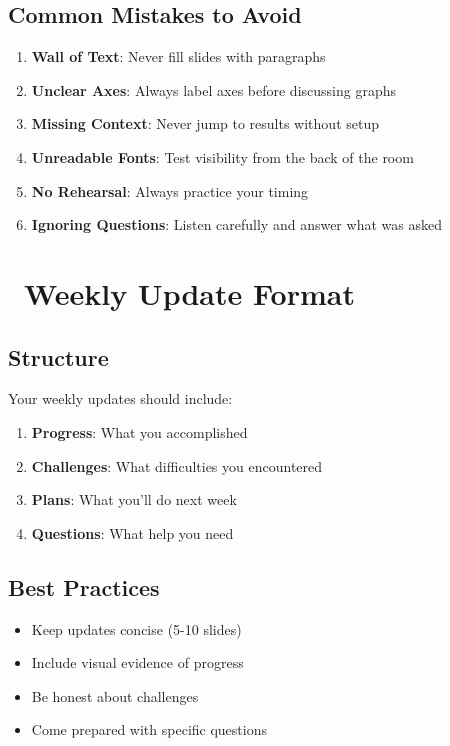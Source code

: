 \documentclass[11pt,a4paper]{article}
\begin{document}
\subsection{Common Mistakes to Avoid}

\begin{tcolorbox}[colback=red!10,colframe=red!50,title=Don't Do This!]
\begin{enumerate}
    \item \textbf{Wall of Text}: Never fill slides with paragraphs
    \item \textbf{Unclear Axes}: Always label axes before discussing graphs
    \item \textbf{Missing Context}: Never jump to results without setup
    \item \textbf{Unreadable Fonts}: Test visibility from the back of the room
    \item \textbf{No Rehearsal}: Always practice your timing
    \item \textbf{Ignoring Questions}: Listen carefully and answer what was asked
\end{enumerate}
\end{tcolorbox}


\section{\faCalendarCheck~Weekly Update Format}

\subsection{Structure}
Your weekly updates should include:
\begin{enumerate}
    \item \textbf{Progress}: What you accomplished
    \item \textbf{Challenges}: What difficulties you encountered
    \item \textbf{Plans}: What you'll do next week
    \item \textbf{Questions}: What help you need
\end{enumerate}

\subsection{Best Practices}
\begin{itemize}
    \item Keep updates concise (5-10 slides)
    \item Include visual evidence of progress
    \item Be honest about challenges
    \item Come prepared with specific questions
\end{itemize}
\end{document}
